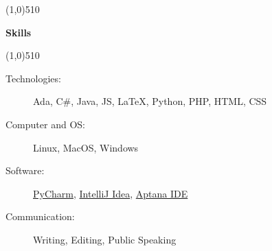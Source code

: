 \documentclass[letterpaper,11pt]{article}
\newcommand{\resheading}[1]{{\large {\begin{minipage}{\textwidth}{\textbf{#1 \vphantom{p\^{E}}}}\end{minipage}}}}
\begin{document}
\line(1,0){510}

\resheading{Skills}

\line(1,0){510}

	\begin{description}
		\item[Technologies:] { \footnotesize 
			Ada, C\#, Java, JS, LaTeX, Python, PHP, HTML, CSS
		}
		\item[Computer and OS:] { \footnotesize
			Linux, MacOS, Windows
		}
		
		\item[Software:]{\footnotesize \href{http://www.jetbrains.com/pycharm/}{PyCharm},
\href{http://www.jetbrains.com/idea/}{IntelliJ Idea},
\href{http://www.aptana.com/}{Aptana IDE}

} 
		\item[Communication:] { \footnotesize
			Writing, Editing, Public Speaking
		}


                   

\end{description}
\end{document}
